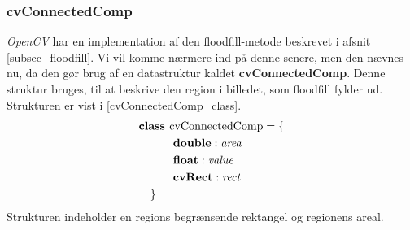 {\subsubsection{cvConnectedComp}
\emph{OpenCV} har en implementation af den floodfill-metode beskrevet i
afsnit \ref{subsec_floodfill}. Vi vil komme nærmere ind på denne senere,
men den nævnes nu, da den gør brug af en datastruktur kaldet
\textbf{cvConnectedComp}. Denne struktur bruges, til at beskrive den
region i billedet, som floodfill fylder ud.  Strukturen er vist i
\eqref{cvConnectedComp_class}.
\begin{multline}
    \textbf{class~} \textrm{cvConnectedComp} = \{ \\
    \shoveleft{\qquad\textbf{double} : \textit{area}} \\
    \shoveleft{\qquad\textbf{float} : \textit{value}} \\
    \shoveleft{\qquad\textbf{cvRect} : \textit{rect}} \\
    \shoveleft{\}}\shoveright{}
    \label{cvConnectedComp_class}
\end{multline}
Strukturen indeholder en regions begrænsende rektangel og regionens
areal.

%

}
